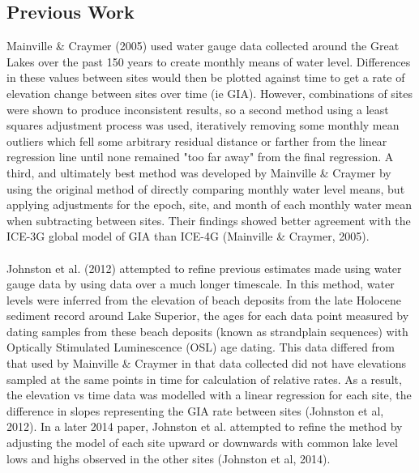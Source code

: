 \subsection{Previous Work} 
Mainville \& Craymer (2005) used water gauge data collected around the Great
 Lakes over the past 150 years to
 create monthly means of water level. Differences in these values between sites
 would then be plotted against time to get a rate of elevation change between
 sites over time (ie GIA). However, combinations of sites were shown to produce
 inconsistent results, so a second method using a least squares adjustment process was used,
 iteratively removing some monthly mean outliers which fell some arbitrary residual distance or
 farther from the linear regression line until none remained "too far away" from
 the final regression. A third, and ultimately best method was developed by
 Mainville \& Craymer by using the original method of directly comparing monthly
 water level means, but applying adjustments for the epoch, site, and month of each
 monthly water mean when subtracting between sites. Their findings showed better agreement with the ICE-3G
 global model of GIA than ICE-4G (Mainville \& Craymer, 2005).\\ \\
Johnston et al. (2012) attempted to refine previous estimates made using water
 gauge data by using data over a much longer timescale. In this method, water
 levels were inferred from the elevation of beach deposits from the late Holocene
 sediment record around Lake Superior, the ages for each data point measured by
 dating samples from these beach deposits (known as strandplain sequences) with
 Optically Stimulated Luminescence (OSL) age dating. This data differed from
 that used by Mainville \& Craymer in that data collected did not have
 elevations sampled at the same points in time for calculation of relative
 rates. As a result, the elevation vs time data was modelled with a linear
 regression for each site, the difference in slopes representing the GIA rate
 between sites (Johnston et al, 2012). In a later 2014 paper, Johnston et al.
 attempted to refine the method by adjusting the model of each site upward or 
 downwards with common lake level lows and highs observed in the other sites
 (Johnston et al, 2014).
 

